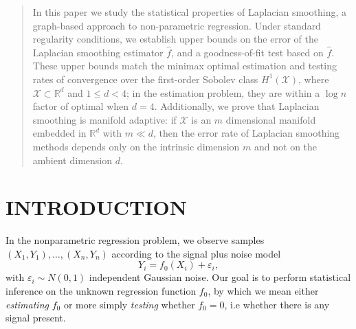 \documentclass[twoside]{article}
\newcommand{\Reals}{\mathbb{R}}
\newcommand{\1}{\mathbf{1}}
\newcommand{\Rd}{\Reals^d}
\newcommand{\Xset}{\mathcal{X}}
\newcommand{\wh}[1]{\widehat{#1}}
\theoremstyle{definition}
\theoremstyle{remark}
\begin{document}
	
	
	

\begin{abstract}
	In this paper we study the statistical properties of Laplacian smoothing, a graph-based approach to non-parametric regression. Under standard regularity conditions, we establish upper bounds on the error of the Laplacian smoothing estimator $\wh{f}$, and a goodness-of-fit test based on $\wh{f}$. These upper bounds match the minimax optimal estimation and testing rates of convergence over the first-order Sobolev class $H^1(\Xset)$, where $\Xset \subset \Rd$ and $1 \leq d < 4$; in the estimation problem, they are within a $\log n$ factor of optimal when $d = 4$. Additionally, we prove that Laplacian smoothing is manifold adaptive: if $\Xset$ is an $m$ dimensional manifold embedded in $\Reals^d$ with $m \ll d$, then the error rate of Laplacian smoothing methods depends only on the intrinsic dimension $m$ and not on the ambient dimension $d$. 
\end{abstract}

\section{INTRODUCTION}
In the nonparametric regression problem, we observe samples $(X_1,Y_1),\ldots,(X_n,Y_n)$ according to the signal plus noise model
\begin{equation}
\label{eqn:signal_plus_noise_model}
Y_i = f_{0}(X_i) + \varepsilon_i,
\end{equation}
with $\varepsilon_i \sim N(0,1)$ independent Gaussian noise. Our goal is to perform statistical inference on the unknown regression function $f_0$, by which we mean either \emph{estimating} $f_0$ or more simply \emph{testing} whether $f_0 = 0$, i.e whether there is any signal present. 
\end{document}
